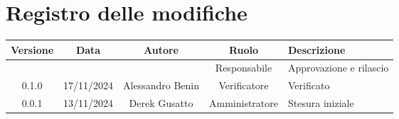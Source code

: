 
\section*{Registro delle modifiche}
\begin{table}[H]
    \begin{tabular}{|c|c|c|c|p{5cm}|}
        \hline
         \textbf{Versione} &  \textbf{Data} &  \textbf{Autore} &  \textbf{Ruolo} & \textbf{Descrizione} \\
          \hline
          &  &  & Responsabile & Approvazione e rilascio\\
          \hline
          0.1.0 & 17/11/2024 & Alessandro Benin & Verificatore  & Verificato \\
          \hline
          0.0.1 & 13/11/2024 & Derek Gusatto & Amministratore  & Stesura iniziale \\
          \hline
    \end{tabular}
\end{table}